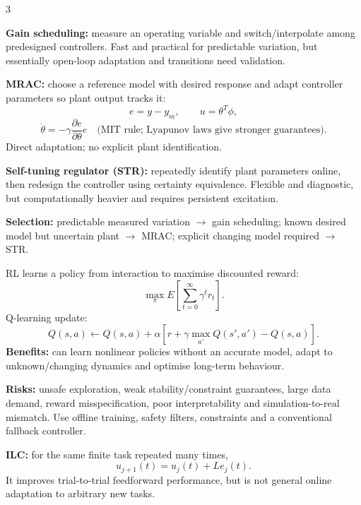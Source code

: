 \documentclass[a4paper,8pt]{extarticle}
\newcommand{\topicdot}[1]{\tikz[baseline=-0.6ex]\fill[#1] (0,0) circle (0.52ex);}
\newcommand{\Edot}{\topicdot{examDot}}
\newcommand{\mybox}[2]{
\begin{tcolorbox}[
  enhanced,
  colback=lightblue!7!white,
  colframe=lightblue!78!black,
  boxrule=0.38pt,
  boxsep=0.7pt,
  left=1.7pt,right=1.7pt,top=1.5pt,bottom=1.5pt,
  arc=0.8pt,outer arc=0.8pt,
  title={\small\textbf{#1}},
  fonttitle=\bfseries,
  coltitle=black,
  before skip=1.5pt,after skip=1.5pt,
  fontupper=\fontsize{5.55pt}{6.30pt}\selectfont\RaggedRight
]
#2
\end{tcolorbox}}
\newcommand{\tinyhead}[1]{\textbf{#1}\;}
\begin{document}
\begin{multicols}{3}
\mybox{Adaptive Control: Gain Scheduling, MRAC, STR \Edot}{
\tinyhead{Gain scheduling:} measure an operating variable and switch/interpolate among predesigned controllers. Fast and practical for predictable variation, but essentially open-loop adaptation and transitions need validation.\par
\tinyhead{MRAC:} choose a reference model with desired response and adapt controller parameters so plant output tracks it:
\[
e=y-y_m,\qquad u=\theta^T\phi,
\]
\[
\dot\theta=-\gamma\frac{\partial e}{\partial\theta}e
\quad\text{(MIT rule; Lyapunov laws give stronger guarantees).}
\]
Direct adaptation; no explicit plant identification.\par
\tinyhead{Self-tuning regulator (STR):} repeatedly identify plant parameters online, then redesign the controller using certainty equivalence. Flexible and diagnostic, but computationally heavier and requires persistent excitation.\par
\tinyhead{Selection:} predictable measured variation $\to$ gain scheduling; known desired model but uncertain plant $\to$ MRAC; explicit changing model required $\to$ STR.
}

\mybox{Reinforcement Learning \& ILC --- Benefits/Risks \Edot}{
RL learns a policy from interaction to maximise discounted reward:
\[
\max_\pi E\!\left[\sum_{t=0}^{\infty}\gamma^tr_t\right].
\]
Q-learning update:
\[
Q(s,a)\leftarrow Q(s,a)+\alpha\left[r+\gamma\max_{a'}Q(s',a')-Q(s,a)\right].
\]
\tinyhead{Benefits:} can learn nonlinear policies without an accurate model, adapt to unknown/changing dynamics and optimise long-term behaviour.\par
\tinyhead{Risks:} unsafe exploration, weak stability/constraint guarantees, large data demand, reward misspecification, poor interpretability and simulation-to-real mismatch. Use offline training, safety filters, constraints and a conventional fallback controller.\par
\tinyhead{ILC:} for the same finite task repeated many times,
\[
u_{j+1}(t)=u_j(t)+L e_j(t).
\]
It improves trial-to-trial feedforward performance, but is not general online adaptation to arbitrary new tasks.
}



\end{multicols}
\end{document}
